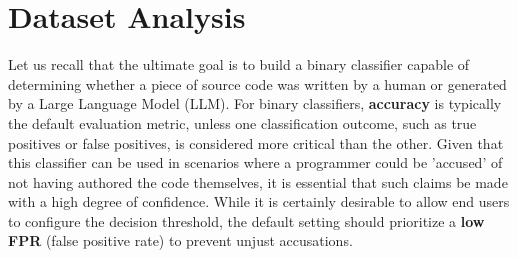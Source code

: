 \chapter{Dataset Analysis}

\justifying

Let us recall that the ultimate goal is to build a binary classifier capable of determining whether a piece of source code was written by a human or generated by a Large Language Model (LLM). For binary classifiers, \textbf{accuracy} is typically the default evaluation metric, unless one classification outcome, such as true positives or false positives, is considered more critical than the other. Given that this classifier can be used in scenarios where a programmer could be 'accused' of not having authored the code themselves, it is essential that such claims be made with a high degree of confidence. While it is certainly desirable to allow end users to configure the decision threshold, the default setting should prioritize a \textbf{low FPR} (false positive rate) to prevent unjust accusations.



